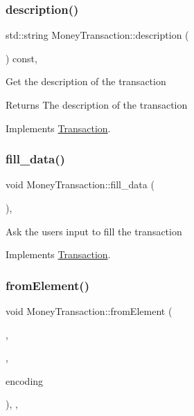 \subsubsection{\texorpdfstring{description()}{description()}}
{\footnotesize\ttfamily std\+::string Money\+Transaction\+::description (\begin{DoxyParamCaption}{ }\end{DoxyParamCaption}) const\hspace{0.3cm}{\ttfamily [override]}, {\ttfamily [virtual]}}

Get the description of the transaction

\begin{DoxyReturn}{Returns}
The description of the transaction 
\end{DoxyReturn}


Implements \mbox{\hyperlink{classTransaction_ad27fb61fcd91863c57ba96a7159b4e8a}{Transaction}}.

\mbox{\label{classMoneyTransaction_a8666737a342f5eb1856006cd970967bf}} 
\subsubsection{\texorpdfstring{fill\+\_\+data()}{fill\_data()}}
{\footnotesize\ttfamily void Money\+Transaction\+::fill\+\_\+data (\begin{DoxyParamCaption}{ }\end{DoxyParamCaption})\hspace{0.3cm}{\ttfamily [override]}, {\ttfamily [virtual]}}

Ask the user\textquotesingle{}s input to fill the transaction 

Implements \mbox{\hyperlink{classTransaction_a73b16e3d7e4c24e5b4da203740691e65}{Transaction}}.

\mbox{\label{classMoneyTransaction_a6f4672dba3a75e2782d15366d9ed7a1e}} 
\subsubsection{\texorpdfstring{from\+Element()}{fromElement()}}
{\footnotesize\ttfamily void Money\+Transaction\+::from\+Element (\begin{DoxyParamCaption}\item[{\mbox{\hyperlink{classElementObject}{Element\+Object}} $\ast$}]{,  }\item[{const \mbox{\hyperlink{classSerializer}{Serializer}} $\ast$}]{,  }\item[{const char $\ast$}]{encoding }\end{DoxyParamCaption})\hspace{0.3cm}{\ttfamily [override]}, {\ttfamily [protected]}, {\ttfamily [virtual]}}

